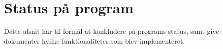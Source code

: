 \section{Status på program} 
\label{sec:status_p_program}

Dette afsnit har til formål at konkludere på programs status, samt give dokumenter hvilke funktionaliteter som blev implementeret. 

